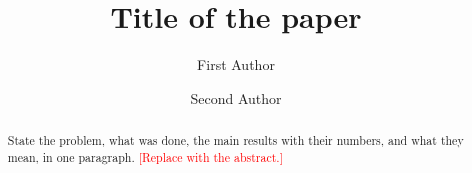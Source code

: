 \documentclass[10pt,twocolumn]{article}
\title{Title of the paper}
\author[1]{First Author}
\author[2,*]{Second Author}
\affil[1]{Department, Institution, Country}
\affil[2]{Department, Institution, Country}
\affil[*]{Corresponding author: \texttt{author@example.org}}
\newcommand{\tbd}[1]{\textcolor{red}{[#1]}}
\begin{document}
\maketitle

\begin{abstract}
State the problem, what was done, the main results with their numbers, and
what they mean, in one paragraph. \tbd{Replace with the abstract.}
\end{abstract}









\end{document}
